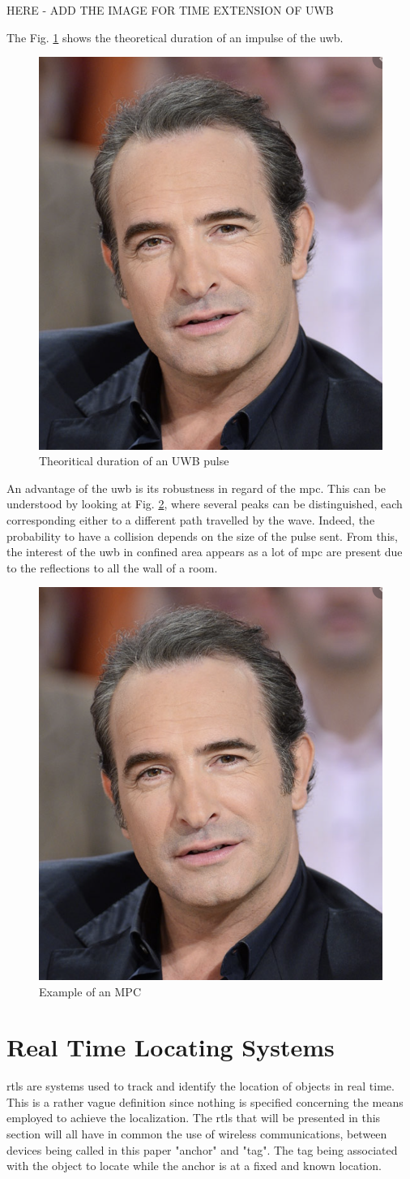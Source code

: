 HERE - ADD THE IMAGE FOR TIME EXTENSION OF UWB

The Fig. \ref{fig:UWB_time} shows the theoretical duration of an impulse of the \gls{uwb}.

\begin{figure}[H]
\centering
\includegraphics[width=.2\linewidth]{Images/Temporary_pic.png}
\caption{Theoritical duration of an UWB pulse}
\label{fig:UWB_time}
\end{figure}

An advantage of the \gls{uwb} is its robustness in regard of the \gls{mpc}. This can be understood by looking at Fig. \ref{fig:UWB_MPC_Theo}, where several peaks can be distinguished, each corresponding either to a different path travelled by the wave. Indeed, the probability to have a collision depends on the size of the pulse sent. From this, the interest of the \gls{uwb} in confined area appears as a lot of \gls{mpc} are present due to the reflections to all the wall of a room.

\begin{figure}[H]
\centering
\includegraphics[width=.2\linewidth]{Images/Temporary_pic.png}
\caption{Example of an MPC}
\label{fig:UWB_MPC_Theo}
\end{figure}

\section{Real Time Locating Systems}
\label{rtls}
\gls{rtls} are systems used to track and identify the location of objects in real time. This is a rather vague definition since nothing is specified concerning the means employed to achieve the localization. The \gls{rtls} that will be presented in this section will all have in common the use of wireless communications, between devices being called in this paper "anchor" and "tag". The tag being associated with the object to locate while the anchor is at a fixed and known location.

